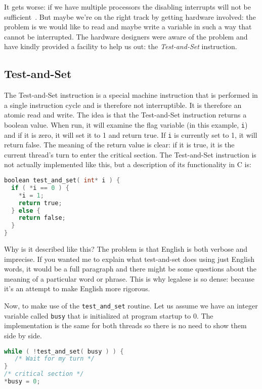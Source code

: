 It gets worse: if we have multiple processors the disabling interrupts will not be sufficient~\cite{osi}. But maybe we're on the right track by getting hardware involved: the problem is we would like to read and maybe write a variable in such a way that cannot be interrupted. The hardware designers were aware of the problem and have kindly provided a facility to help us out: the \textit{Test-and-Set} instruction.

\subsection*{Test-and-Set}
The Test-and-Set instruction is a special machine instruction that is performed in a single instruction cycle and is therefore not interruptible. It is therefore an atomic read and write. The idea is that the Test-and-Set instruction returns a boolean value. When run, it will examine the flag variable (in this example, \texttt{i}) and if it is zero, it will set it to 1 and return true. If \texttt{i} is currently set to 1, it will return false. The meaning of the return value is clear: if it is true, it is the current thread's turn to enter the critical section. The Test-and-Set instruction is not actually implemented like this, but a description of its functionality in C is:

\begin{lstlisting}[language=C]
boolean test_and_set( int* i ) {
  if ( *i == 0 ) {
    *i = 1;
    return true;
  } else {
    return false;
  }
}
\end{lstlisting}

Why is it described like this? The problem is that English is both verbose and imprecise. If you wanted me to explain what test-and-set does using just English words, it would be a full paragraph and there might be some questions about the meaning of a particular word or phrase. This is why legalese is so dense: because it's an attempt to make English more rigorous.

Now, to make use of the \texttt{test\_and\_set} routine. Let us assume we have an integer variable called \texttt{busy} that is initialized at program startup to 0. The implementation is the same for both threads so there is no need to show them side by side.

\begin{lstlisting}[language=C]
while ( !test_and_set( busy ) ) {
   /* Wait for my turn */
}
/* critical section */
*busy = 0;
\end{lstlisting}

